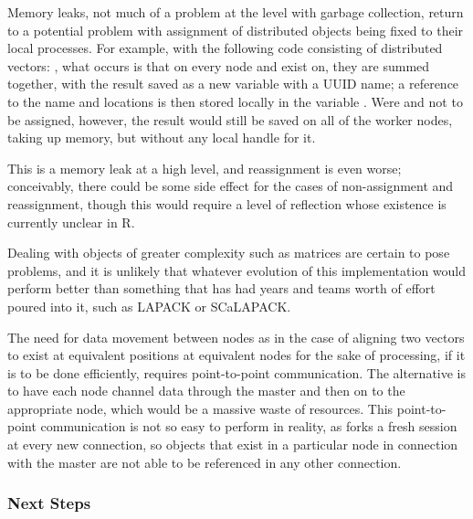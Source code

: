Memory leaks, not much of a problem at the \R{} level with garbage
collection, return to a potential problem with assignment of distributed
objects being fixed to their local \R{} processes. For example, with the
following code consisting of distributed vectors:
, what occurs is that on every node
 and  exist on, they are summed together, with the
result saved as a new variable with a UUID name; a reference to the name
and locations is then stored locally in the variable . Were
 and  not to be assigned, however, the result would
still be saved on all of the worker nodes, taking up memory, but without
any local handle for it.

This is a memory leak at a high level, and reassignment is even worse;
conceivably, there could be some side effect for the cases of
non-assignment and reassignment, though this would require a level of
reflection whose existence is currently unclear in R.

Dealing with objects of greater complexity such as matrices are certain
to pose problems, and it is unlikely that whatever evolution of this
implementation would perform better than something that has had years
and teams worth of effort poured into it, such as LAPACK or SCaLAPACK.

The need for data movement between nodes as in the case of aligning two
vectors to exist at equivalent positions at equivalent nodes for the
sake of processing, if it is to be done efficiently, requires
point-to-point communication. The alternative is to have each node
channel data through the master and then on to the appropriate node,
which would be a massive waste of resources. This point-to-point
communication is not so easy to perform in reality, as  forks a
fresh \R{} session at every new connection, so objects that exist in a
particular node in connection with the master are not able to be
referenced in any other connection.

\subsubsection{Next Steps}\label{next-steps}

